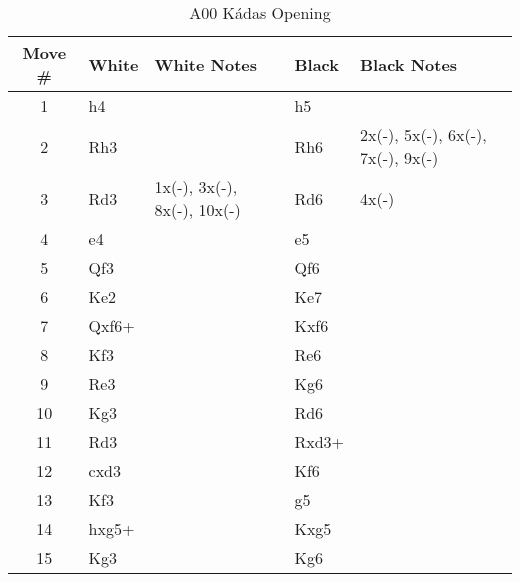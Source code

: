 \begin{table}[htbp]
\centering
\scriptsize
\caption{A00 Kádas Opening}
\begin{tabular}{|c|l|p{5cm}|l|p{5cm}|}
\hline
\textbf{Move \#} & \textbf{White} & \textbf{White Notes} & \textbf{Black} & \textbf{Black Notes} \\
\hline
1  & h4      &                   & h5      &                        \\
2  & Rh3     &                   & Rh6     & 2x(-), 5x(-), 6x(-), 7x(-), 9x(-) \\
3  & Rd3     & 1x(-), 3x(-), 8x(-), 10x(-) & Rd6     & 4x(-)                  \\
4  & e4      &                   & e5      &                        \\
5  & Qf3     &                   & Qf6     &                        \\
6  & Ke2     &                   & Ke7     &                        \\
7  & Qxf6+   &                   & Kxf6    &                        \\
8  & Kf3     &                   & Re6     &                        \\
9  & Re3     &                   & Kg6     &                        \\
10 & Kg3     &                   & Rd6     &                        \\
11 & Rd3     &                   & Rxd3+   &                        \\
12 & cxd3    &                   & Kf6     &                        \\
13 & Kf3     &                   & g5      &                        \\
14 & hxg5+   &                   & Kxg5    &                        \\
15 & Kg3     &                   & Kg6     &                        \\
\hline
\end{tabular}
\end{table}


